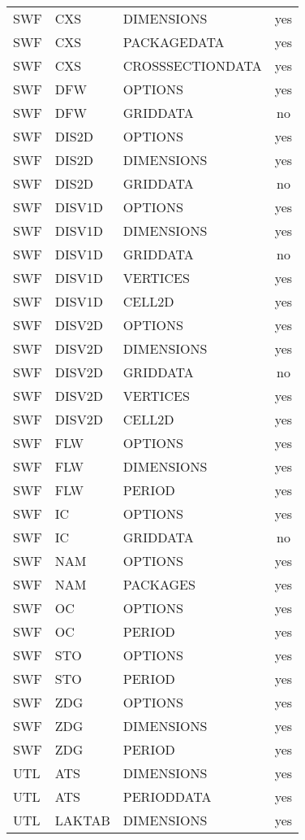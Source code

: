 \begin{longtable}{p{1.5cm} p{1.5cm} p{3cm} c}
SWF & CXS & DIMENSIONS & yes \\ 
SWF & CXS & PACKAGEDATA & yes \\ 
SWF & CXS & CROSSSECTIONDATA & yes \\ 
\hline
SWF & DFW & OPTIONS & yes \\ 
SWF & DFW & GRIDDATA & no \\ 
\hline
SWF & DIS2D & OPTIONS & yes \\ 
SWF & DIS2D & DIMENSIONS & yes \\ 
SWF & DIS2D & GRIDDATA & no \\ 
\hline
SWF & DISV1D & OPTIONS & yes \\ 
SWF & DISV1D & DIMENSIONS & yes \\ 
SWF & DISV1D & GRIDDATA & no \\ 
SWF & DISV1D & VERTICES & yes \\ 
SWF & DISV1D & CELL2D & yes \\ 
\hline
SWF & DISV2D & OPTIONS & yes \\ 
SWF & DISV2D & DIMENSIONS & yes \\ 
SWF & DISV2D & GRIDDATA & no \\ 
SWF & DISV2D & VERTICES & yes \\ 
SWF & DISV2D & CELL2D & yes \\ 
\hline
SWF & FLW & OPTIONS & yes \\ 
SWF & FLW & DIMENSIONS & yes \\ 
SWF & FLW & PERIOD & yes \\ 
\hline
SWF & IC & OPTIONS & yes \\ 
SWF & IC & GRIDDATA & no \\ 
\hline
SWF & NAM & OPTIONS & yes \\ 
SWF & NAM & PACKAGES & yes \\ 
\hline
SWF & OC & OPTIONS & yes \\ 
SWF & OC & PERIOD & yes \\ 
\hline
SWF & STO & OPTIONS & yes \\ 
SWF & STO & PERIOD & yes \\ 
\hline
SWF & ZDG & OPTIONS & yes \\ 
SWF & ZDG & DIMENSIONS & yes \\ 
SWF & ZDG & PERIOD & yes \\ 
\hline
UTL & ATS & DIMENSIONS & yes \\ 
UTL & ATS & PERIODDATA & yes \\ 
\hline
UTL & LAKTAB & DIMENSIONS & yes \\ 

\end{longtable}
